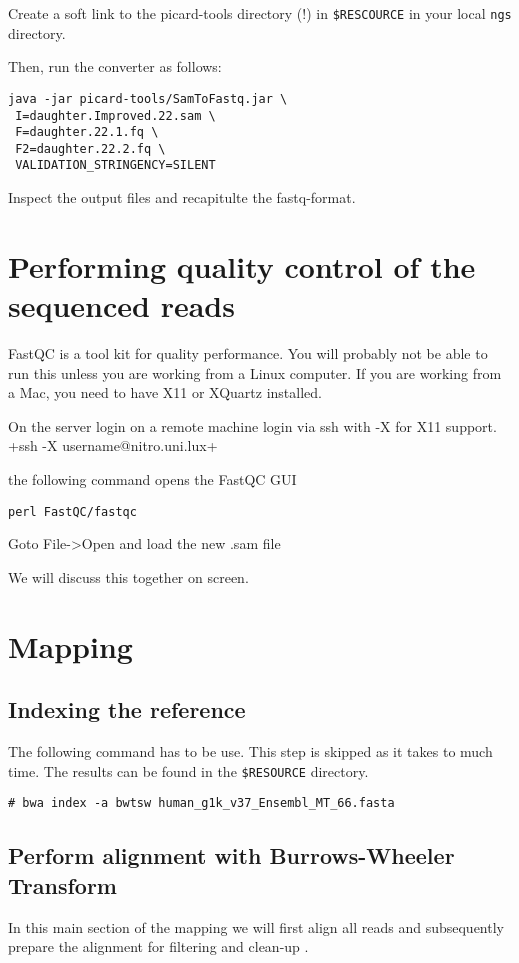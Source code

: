 \documentclass{article}
\begin{document}
Create a soft link to the picard-tools directory (!) in \verb+$RESCOURCE+ in your local \verb+ngs+ directory. 

Then, run the converter as follows:

\begin{verbatim}
java -jar picard-tools/SamToFastq.jar \
 I=daughter.Improved.22.sam \
 F=daughter.22.1.fq \
 F2=daughter.22.2.fq \
 VALIDATION_STRINGENCY=SILENT
\end{verbatim}

Inspect the output files and recapitulte the fastq-format.

\section{Performing quality control of the sequenced reads}
FastQC is a tool kit for quality performance. You will probably not be able to run 
this unless you are working from a Linux computer. 
If you are working from a Mac, you need to have X11 or XQuartz installed.

On the server login on a remote machine login via ssh with -X for X11 support.
\mint{bash}+ssh -X username@nitro.uni.lux+

the following command opens the FastQC GUI
\begin{verbatim}
perl FastQC/fastqc
\end{verbatim}

Goto File->Open
and load the new .sam file

We will discuss this together on screen. 

\section{Mapping}
\subsection{Indexing the reference }
The following command has to be use. This step is skipped as it takes to much time. The results can be found
in the \verb+$RESOURCE+ directory.
\begin{verbatim}
# bwa index -a bwtsw human_g1k_v37_Ensembl_MT_66.fasta
\end{verbatim}



\subsection{Perform alignment with Burrows-Wheeler Transform} 
In this main section of the mapping we will first align all reads and subsequently 
prepare the alignment for filtering and clean-up .
\end{document}
